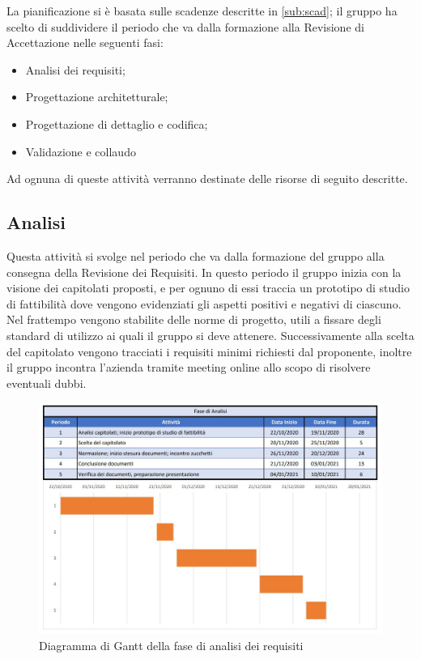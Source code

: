\documentclass[../piano_di_progetto.tex]{subfiles}
\begin{document}
La pianificazione si è basata sulle scadenze descritte in \ref{sub:scad}; il gruppo ha scelto di suddividere il periodo che va dalla formazione alla Revisione di Accettazione nelle seguenti fasi:
\begin{itemize}
\item Analisi dei requisiti;
\item Progettazione architetturale;
\item Progettazione di dettaglio e codifica;
\item Validazione e collaudo
\end{itemize}
Ad ognuna di queste attività verranno destinate delle risorse di seguito descritte.


\subsection{Analisi}%
\label{sub:analisi}
Questa attività si svolge nel periodo che va dalla formazione del gruppo alla consegna della Revisione dei Requisiti. In questo periodo il gruppo inizia con la visione dei capitolati proposti, e per ognuno di essi traccia un prototipo di studio di fattibilità dove vengono evidenziati gli aspetti positivi e negativi di ciascuno. Nel frattempo vengono stabilite delle norme di progetto, utili a fissare degli standard di utilizzo ai quali il gruppo si deve attenere. Successivamente alla scelta del capitolato vengono tracciati i requisiti minimi richiesti dal proponente, inoltre il gruppo incontra l’azienda tramite meeting online allo scopo di risolvere eventuali dubbi. 

\begin{figure}[H]
\centering
\includegraphics[width=12cm]{componenti/fase_analisi}
\caption{Diagramma di Gantt della fase di analisi dei requisiti}
\end{figure}
\end{document}
